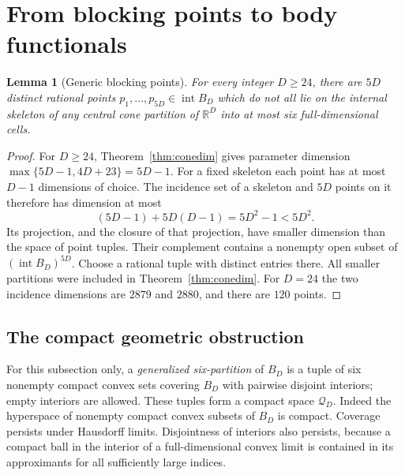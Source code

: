 \documentclass[a4paper,11pt,reqno]{amsart}
\newcommand{\R}{\mathbb R}
\newcommand{\intt}{\operatorname{int}}
\newtheorem{lemma}[theorem]{Lemma}
\theoremstyle{definition}
\theoremstyle{remark}
\numberwithin{equation}{section}
\begin{document}
\section{From blocking points to body functionals}\label{sec:transfer}

\begin{lemma}[Generic blocking points]\label{lem:blockers}
For every integer $D\ge24$, there are $5D$ distinct rational points
$p_1,\ldots,p_{5D}\in\intt B_D$ which do not all lie on the internal
skeleton of any central cone partition of $\R^D$ into at most six
full-dimensional cells.
\end{lemma}
\begin{proof}
For $D\ge24$, Theorem~\ref{thm:conedim} gives parameter dimension
$\max\{5D-1,4D+23\}=5D-1$. For a fixed skeleton each point has at
most $D-1$ dimensions of choice. The incidence set of a skeleton and
$5D$ points on it therefore has dimension at most
\[
                (5D-1)+5D(D-1)=5D^2-1<5D^2.
\]
Its projection, and the closure of that projection, have smaller
dimension than the space of point tuples. Their complement contains
a nonempty open subset of $(\intt B_D)^{5D}$. Choose a rational tuple
with distinct entries there. All smaller partitions were included in
Theorem~\ref{thm:conedim}. For $D=24$ the two incidence dimensions are
$2879$ and $2880$, and there are $120$ points.
\end{proof}

\subsection{The compact geometric obstruction}
For this subsection only, a \emph{generalized six-partition} of $B_D$
is a tuple of six nonempty compact convex sets covering $B_D$ with
pairwise disjoint interiors; empty interiors are allowed. These
tuples form a compact space $\mathcal Q_D$. Indeed the hyperspace of
nonempty compact convex subsets of $B_D$ is compact. Coverage persists
under Hausdorff limits. Disjointness of interiors also persists,
because a compact ball in the interior of a full-dimensional convex
limit is contained in its approximants for all sufficiently large
indices.
\end{document}
